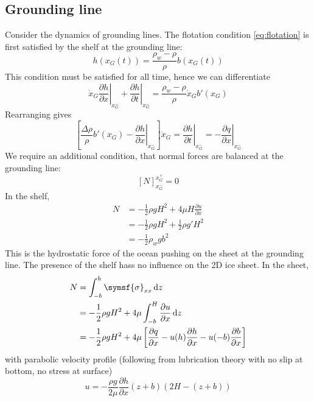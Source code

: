 \documentclass{jknotes}
\begin{document}
\subsection{Grounding line}
Consider the dynamics of grounding lines. The flotation condition
\eqref{eq:flotation} is first satisfied by the shelf at the grounding line:
\begin{equation}
	h(x_G(t)) = \frac{\rho_w - \rho}{\rho} b(x_G(t))
\end{equation}
This condition must be satisfied for all time, hence we can differentiate
\begin{equation}
	\dot{x}_G \left.\frac{\partial h}{\partial x}\right|_{x_G^-} +
	\left.\frac{\partial h}{\partial t}\right|_{x_G^-}
	= \frac{\rho_w - \rho}{\rho} \dot{x}_G b'(x_G)
\end{equation}
Rearranging gives
\begin{equation}
	\left[ \frac{\Delta \rho}{\rho} b'(x_G) - \left.\frac{\partial h}{\partial
	x}\right|_{x_G^-} \right] \dot{x}_G = \left.\frac{\partial h}{\partial
	t}\right|_{x_G^-} = -\left.\frac{\partial q}{\partial x}\right|_{x_G^-}
	\label{eq:l16:1}
\end{equation}
We require an additional condition, that normal forces are balanced at the
grounding line:
\begin{equation}
	\left[ N \right]^{x_G^+}_{x_G^-} = 0
\end{equation}
In the shelf,
\begin{align}
	N &= -\frac{1}{2}\rho g H^2 + 4\mu H \frac{\partial u}{\partial x} \\
	  &= -\frac{1}{2}\rho g H^2 + \frac{1}{2}\rho g' H^2 \\
	  &= -\frac{1}{2}\rho_w g b^2
\end{align}
This is the hydrostatic force of the ocean pushing on the sheet at the
grounding line. The presence of the shelf hass no influence on the 2D ice
sheet. In the sheet,
\begin{align}
	N &= \int_{-b}^h \symsf{\sigma}_{xx} \, \diffd z \\
	  &= -\frac{1}{2} \rho g H^2 + 4\mu \int_{-b}^H \frac{\partial u}{\partial
	  x} \, \diffd z \\
	  &= -\frac{1}{2} \rho g H^2 + 4\mu \left[ \frac{\partial q}{\partial x} -
	  u(h)\frac{\partial h}{\partial x} - u(-b)\frac{\partial b}{\partial x}
	  \right] 
\end{align}
with parabolic velocity profile (following from lubrication theory with no
slip at bottom, no stress at surface)
\begin{equation}
	u = -\frac{\rho g}{2\mu} \frac{\partial h}{\partial x}(z+b)(2H-(z+b))
\end{equation}
\end{document}
